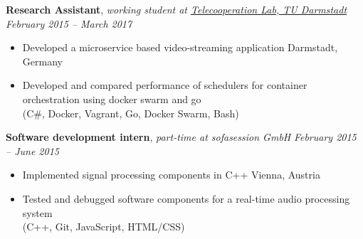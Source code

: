 \documentclass[9pt]{extarticle}
\begin{document}
\noindent
{\bf Research Assistant}, \textit{working student at \href{https://www.informatik.tu-darmstadt.de/telekooperation/telecooperation_group/index.en.jsp}{Telecooperation Lab, TU Darmstadt}}  \hfill \textit{February 2015 -- March 2017}
\begin{itemize}
\setlength\itemsep{0.05em}
    \item Developed a microservice based video-streaming application \hfill Darmstadt, Germany
    \item Developed and compared performance of schedulers for container orchestration using docker swarm and go \\
    (C\#, Docker, Vagrant, Go, Docker Swarm, Bash) \\
\end{itemize}


\noindent
{\bf Software development intern}, \textit{part-time at sofasession GmbH}  \hfill \textit{February 2015 -- June 2015}
\begin{itemize}
    \setlength\itemsep{0.05em}
    \item Implemented signal processing components in C++ \hfill Vienna, Austria
    \item Tested and debugged software components for a real-time audio processing system \\
    (C++, Git, JavaScript, HTML/CSS) \\
\end{itemize}
\end{document}
